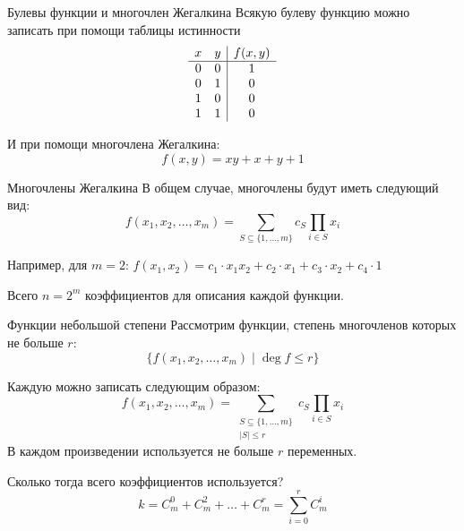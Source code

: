 \begin{frame}{Булевы функции и многочлен Жегалкина}
    Всякую булеву функцию можно записать при помощи таблицы истинности
    \[
        \begin{array}{cc | c}
            x & y & f(x, y) \\\hline
            0 & 0 & 1 \\
            0 & 1 & 0 \\
            1 & 0 & 0 \\
            1 & 1 & 0
        \end{array}
    \]
    
    И при помощи многочлена Жегалкина:
    \[
        f(x, y) = xy + x + y + 1
    \]
\end{frame}

\begin{frame}{Многочлены Жегалкина}
    В общем случае, многочлены будут иметь следующий вид:
    \[
        f(x_1, x_2, …, x_m) = \sum_{S ⊆ \{1, …, m\}} c_S \prod_{i ∈ S} x_i
    \]

    Например, для $m = 2$: $ f(x_1, x_2) = c_1 \cdot x_1x_2 + c_2 \cdot x_1 + c_3 \cdot x_2 + c_4\cdot1$
    
    Всего $n = 2^m$ коэффициентов для описания каждой функции.
\end{frame}

\begin{frame}{Функции небольшой степени}
    Рассмотрим функции, степень многочленов которых не больше $r$:
    \[
        \{ f(x_1, x_2, …, x_m) \mid \deg f ≤ r \}
    \]
    
    Каждую можно записать следующим образом:
    \[
        f(x_1, x_2, …, x_m) = \sum_{\substack{S ⊆ \{1, …, m\}\\|S| ≤ r}} c_S \prod_{i ∈ S} x_i
    \]
    В каждом произведении используется не больше $r$ переменных.
    

    Сколько тогда всего коэффициентов используется?
    \[
        k = C_m^0 + C_m^2 + … + C_m^r = \sum_{i=0}^r C_m^i
    \]
    
\end{frame}

